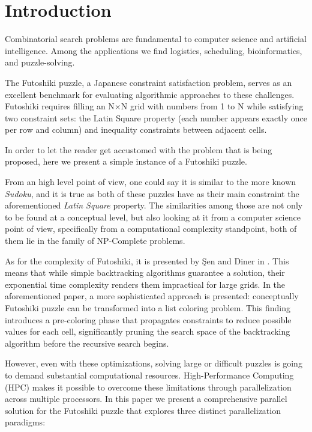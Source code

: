 \section{Introduction}
\label{sec:intro}
Combinatorial search problems are fundamental to computer science and artificial intelligence. Among the applications we find logistics, scheduling, bioinformatics, and puzzle-solving. 

The Futoshiki puzzle, a Japanese constraint satisfaction problem, serves as an excellent benchmark for evaluating algorithmic approaches to these challenges. Futoshiki requires filling an N×N grid with numbers from 1 to N while satisfying two constraint sets: the Latin Square property (each number appears exactly once per row and column) and inequality constraints between adjacent cells.

In order to let the reader get accustomed with the problem that is being proposed, here we present a simple instance of a Futoshiki puzzle.

From an high level point of view, one could say it is similar to the more known \textit{Sudoku}, and it is true as both of these puzzles have as their main constraint the aforementioned \textit{Latin Square} property. The similarities among those are not only to be found at a conceptual level, but also looking at it from a computer science point of view, specifically from a computational complexity standpoint, both of them lie in the family of NP-Complete problems. 

As for the complexity of Futoshiki, it is presented by Şen and Diner in \cite{Sen2024Futoshiki}. This means that while simple backtracking algorithms guarantee a solution, their exponential time complexity renders them impractical for large grids. In the aforementioned paper, a more sophisticated approach is presented: conceptually Futoshiki puzzle can be transformed into a list coloring problem. This finding introduces a pre-coloring phase that propagates constraints to reduce possible values for each cell, significantly pruning the search space of the backtracking algorithm before the recursive search begins.

However, even with these optimizations, solving large or difficult puzzles is going to demand substantial computational resources. High-Performance Computing (HPC) makes it possible to overcome these limitations through parallelization across multiple processors. In this paper we present a comprehensive parallel solution for the Futoshiki puzzle that explores three distinct parallelization paradigms:

